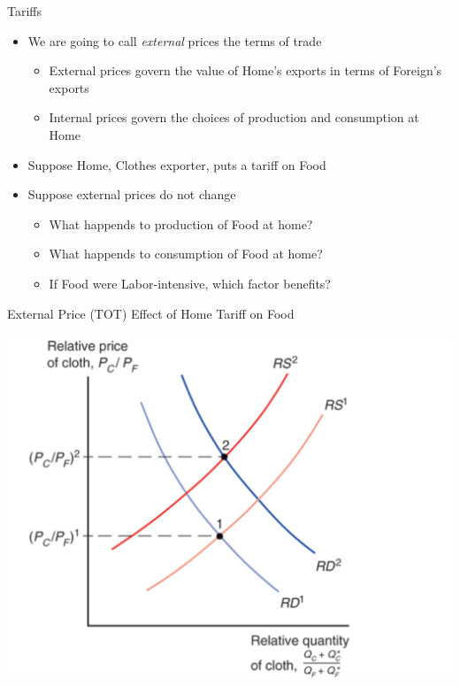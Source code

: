 \documentclass[ignorenonframetext,]{beamer}
\begin{document}
\begin{frame}{Tariffs}
    
    \begin{itemize}
        \item We are going to call \emph{external} prices the terms of trade
        \begin{itemize}
            \item External prices govern the value of Home's exports in terms of Foreign's exports
            \item Internal prices govern the choices of production and consumption at Home
        \end{itemize}
        \item Suppose Home, Clothes exporter, puts a tariff on Food
        \item Suppose external prices do not change
        \begin{itemize}
            \item What happends to production of Food at home?
            \item What happends to consumption of Food at home?
            \item If Food were Labor-intensive, which factor benefits?
        \end{itemize}
    \end{itemize}

\end{frame}

\begin{frame}{External Price (TOT) Effect of Home Tariff on Food}

    \includegraphics[scale=0.25]{tariff_tot.png}

\end{frame}
\end{document}
